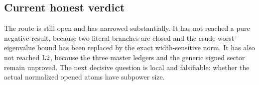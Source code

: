 \subsection*{Current honest verdict}

The route is still open and has narrowed substantially.  It has not
reached a pure negative result, because two literal branches are
closed and the crude worst-eigenvalue bound has been replaced by
the exact width-sensitive norm.  It has also
not reached \(\mathrm{L2}\), because the three master ledgers and the
generic signed sector remain unproved.  The next decisive question
is local and falsifiable: whether the actual normalized opened atoms
have subpower size.
